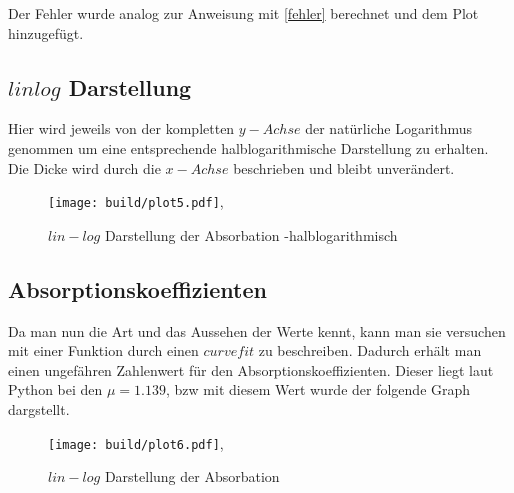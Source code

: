 Der Fehler wurde analog zur Anweisung mit \eqref{fehler} berechnet und dem Plot hinzugefügt.

\subsection{$lin log$ Darstellung} 
Hier wird jeweils von der kompletten $y-Achse$ der natürliche Logarithmus genommen um eine entsprechende halblogarithmische Darstellung zu erhalten.
Die Dicke wird durch die $x-Achse$ beschrieben und bleibt unverändert.

\begin{figure}
    \centering
    \texttt{[image: build/plot5.pdf]},
   \caption{$lin-log$ Darstellung der Absorbation -halblogarithmisch}
   \label{fig:linlin}
\end{figure}


\subsection{Absorptionskoeffizienten}
Da man nun die Art und das Aussehen der Werte kennt, kann man sie versuchen mit einer Funktion durch einen $curvefit$ zu beschreiben. 
Dadurch erhält man einen ungefähren Zahlenwert für den Absorptionskoeffizienten. Dieser liegt laut Python bei den $\mu = 1.139$, bzw mit diesem Wert wurde der folgende Graph dargstellt.


\begin{figure}
    \centering
    \texttt{[image: build/plot6.pdf]},
   \caption{$lin-log$ Darstellung der Absorbation}
   \label{fig:linlin}
\end{figure}

